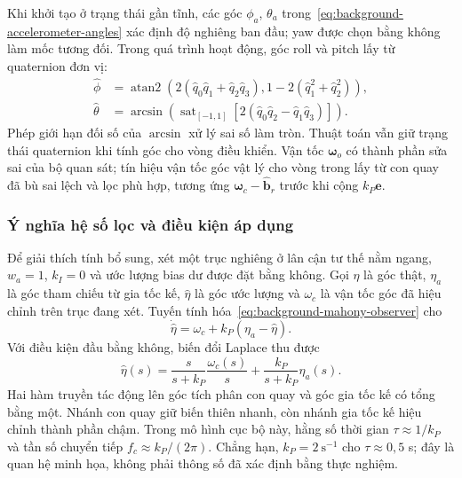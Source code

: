 Khi khởi tạo ở trạng thái gần tĩnh, các góc $\phi_a$, $\theta_a$ trong~\eqref{eq:background-accelerometer-angles} xác định độ nghiêng ban đầu; yaw được chọn bằng không làm mốc tương đối. Trong quá trình hoạt động, góc roll và pitch lấy từ quaternion đơn vị:
\begin{equation}
    \begin{aligned}
        \hat\phi&=\operatorname{atan2}
            \left(2(\hat q_0\hat q_1+\hat q_2\hat q_3),
            1-2(\hat q_1^2+\hat q_2^2)\right),\\
        \hat\theta&=\arcsin
            \left(\operatorname{sat}_{[-1,1]}
            \!\left[2(\hat q_0\hat q_2-\hat q_1\hat q_3)\right]\right).
    \end{aligned}
    \label{eq:background-mahony-euler-output}
\end{equation}
Phép giới hạn đối số của $\arcsin$ xử lý sai số làm tròn. Thuật toán vẫn giữ trạng thái quaternion khi tính góc cho vòng điều khiển. Vận tốc $\symbf\omega_o$ có thành phần sửa sai của bộ quan sát; tín hiệu vận tốc góc vật lý cho vòng trong lấy từ con quay đã bù sai lệch và lọc phù hợp, tương ứng $\symbf\omega_c-\hat{\mathbf b}_r$ trước khi cộng $k_P\mathbf e$.

\subsubsection{Ý nghĩa hệ số lọc và điều kiện áp dụng}

Để giải thích tính bổ sung, xét một trục nghiêng ở lân cận tư thế nằm ngang, $w_a=1$, $k_I=0$ và ước lượng bias dư được đặt bằng không. Gọi $\eta$ là góc thật, $\eta_a$ là góc tham chiếu từ gia tốc kế, $\hat\eta$ là góc ước lượng và $\omega_c$ là vận tốc góc đã hiệu chỉnh trên trục đang xét. Tuyến tính hóa~\eqref{eq:background-mahony-observer} cho
\begin{equation}
    \dot{\hat\eta}=\omega_c+k_P(\eta_a-\hat\eta).
    \label{eq:background-mahony-local-model}
\end{equation}
Với điều kiện đầu bằng không, biến đổi Laplace thu được
\begin{equation}
    \hat\eta(s)=\frac{s}{s+k_P}\frac{\omega_c(s)}{s}
        +\frac{k_P}{s+k_P}\eta_a(s).
    \label{eq:background-mahony-complementary}
\end{equation}
Hai hàm truyền tác động lên góc tích phân con quay và góc gia tốc kế có tổng bằng một. Nhánh con quay giữ biến thiên nhanh, còn nhánh gia tốc kế hiệu chỉnh thành phần chậm. Trong mô hình cục bộ này, hằng số thời gian $\tau\approx1/k_P$ và tần số chuyển tiếp $f_c\approx k_P/(2\pi)$. Chẳng hạn, $k_P=2\ \mathrm{s^{-1}}$ cho $\tau\approx0{,}5$ s; đây là quan hệ minh họa, không phải thông số đã xác định bằng thực nghiệm.

